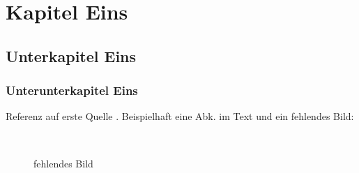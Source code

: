 \section{Kapitel Eins}
\subsection{Unterkapitel Eins}
\subsubsection{Unterunterkapitel Eins}
Referenz auf erste Quelle \cite{refname}. Beispielhaft eine \acs{Abk.} im Text und ein fehlendes Bild:
\\
\begin{figure}[h]
\caption{fehlendes Bild}
\begin{center}
\\
\end{center}
\label{fig:bridge}
\end{figure}
